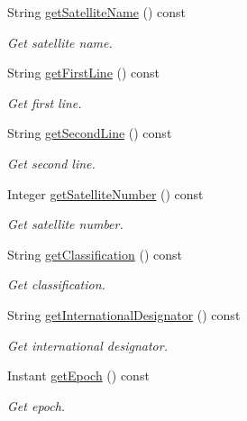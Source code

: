 \begin{DoxyCompactItemize}
String \hyperlink{classlibrary_1_1astro_1_1trajectory_1_1orbit_1_1models_1_1sgp4_1_1_t_l_e_a95bb43f9fcf34aee66da615eee909c58}{get\+Satellite\+Name} () const
\begin{DoxyCompactList}\small\item\em Get satellite name. \end{DoxyCompactList}\item 
String \hyperlink{classlibrary_1_1astro_1_1trajectory_1_1orbit_1_1models_1_1sgp4_1_1_t_l_e_a390add219b29b269b22ba2c4d8509fca}{get\+First\+Line} () const
\begin{DoxyCompactList}\small\item\em Get first line. \end{DoxyCompactList}\item 
String \hyperlink{classlibrary_1_1astro_1_1trajectory_1_1orbit_1_1models_1_1sgp4_1_1_t_l_e_a7d4dbf43018504d01585eb1758821aed}{get\+Second\+Line} () const
\begin{DoxyCompactList}\small\item\em Get second line. \end{DoxyCompactList}\item 
Integer \hyperlink{classlibrary_1_1astro_1_1trajectory_1_1orbit_1_1models_1_1sgp4_1_1_t_l_e_acd4260dc4791a44d92e6308a956ff611}{get\+Satellite\+Number} () const
\begin{DoxyCompactList}\small\item\em Get satellite number. \end{DoxyCompactList}\item 
String \hyperlink{classlibrary_1_1astro_1_1trajectory_1_1orbit_1_1models_1_1sgp4_1_1_t_l_e_ae181d950f26600be44624768e31ec3d6}{get\+Classification} () const
\begin{DoxyCompactList}\small\item\em Get classification. \end{DoxyCompactList}\item 
String \hyperlink{classlibrary_1_1astro_1_1trajectory_1_1orbit_1_1models_1_1sgp4_1_1_t_l_e_a20c54ea4314e24dec277ecec17cd2551}{get\+International\+Designator} () const
\begin{DoxyCompactList}\small\item\em Get international designator. \end{DoxyCompactList}\item 
Instant \hyperlink{classlibrary_1_1astro_1_1trajectory_1_1orbit_1_1models_1_1sgp4_1_1_t_l_e_a55543a5f555422eaefab692c19a3d9ea}{get\+Epoch} () const
\begin{DoxyCompactList}\small\item\em Get epoch. \end{DoxyCompactList}\item 

\end{DoxyCompactItemize}
